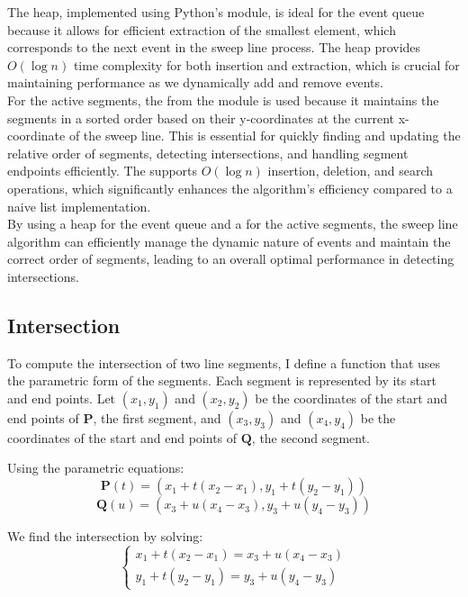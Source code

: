 \documentclass[10pt,a4paper,hidelinks]{article}
\begin{document}
The heap, implemented using Python's  module, is ideal for the event queue because it allows for efficient extraction of the smallest element, which corresponds to the next event in the sweep line process. The heap provides $O(\log n)$ time complexity for both insertion and extraction, which is crucial for maintaining performance as we dynamically add and remove events.\\

For the active segments, the  from the  module is used because it maintains the segments in a sorted order based on their y-coordinates at the current x-coordinate of the sweep line. This is essential for quickly finding and updating the relative order of segments, detecting intersections, and handling segment endpoints efficiently. The  supports $O(\log n)$ insertion, deletion, and search operations, which significantly enhances the algorithm's efficiency compared to a naive list implementation.\\

By using a heap for the event queue and a  for the active segments, the sweep line algorithm can efficiently manage the dynamic nature of events and maintain the correct order of segments, leading to an overall optimal performance in detecting intersections.


\subsection{Intersection}
To compute the intersection of two line segments, I define a function  that uses the parametric form of the segments. Each segment is represented by its start and end points. Let $(x_1, y_1)$ and $(x_2, y_2)$ be the coordinates of the start and end points of $\mathbf{P}$, the first segment, and $(x_3, y_3)$ and $(x_4, y_4)$ be the coordinates of the start and end points of $\mathbf{Q}$, the second segment.

Using the parametric equations:
$$\mathbf{P}(t) = (x_1 + t(x_2 - x_1), y_1 + t(y_2 - y_1))$$
$$\mathbf{Q}(u) = (x_3 + u(x_4 - x_3), y_3 + u(y_4 - y_3))$$

We find the intersection by solving:
$$\left\{\begin{array}{l}
    x_1 + t(x_2 - x_1) = x_3 + u(x_4 - x_3)\\
    y_1 + t(y_2 - y_1) = y_3 + u(y_4 - y_3)
\end{array}\right.$$
\end{document}
